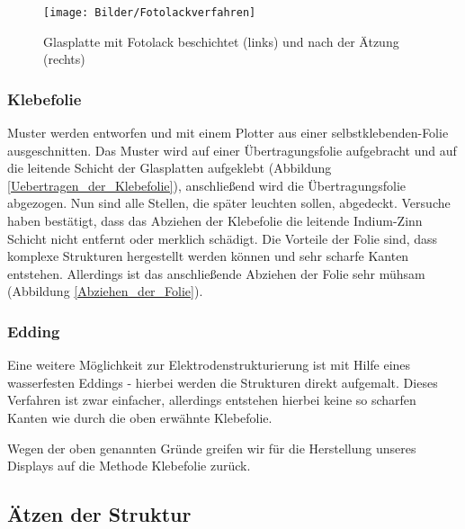 \begin{figure}[t]
  \centering
  \texttt{[image: Bilder/Fotolackverfahren]}
  \caption{Glasplatte mit Fotolack beschichtet (links) und nach der Ätzung (rechts)}
  \label{Fotolackverfahren}
\end{figure}



\subsubsection*{Klebefolie}\label{subsec:klebefolie}
Muster werden entworfen und mit einem Plotter aus einer selbstklebenden-Folie ausgeschnitten. Das Muster wird auf einer Übertragungsfolie aufgebracht und auf die leitende Schicht der Glasplatten aufgeklebt (Abbildung \ref{Uebertragen_der_Klebefolie}), anschließend wird die Übertragungsfolie abgezogen. Nun sind alle Stellen, die später leuchten sollen, abgedeckt. Versuche haben bestätigt, dass das Abziehen der Klebefolie die leitende Indium-Zinn Schicht nicht entfernt oder merklich schädigt. Die Vorteile der Folie sind, dass komplexe Strukturen hergestellt werden können und sehr scharfe Kanten entstehen. Allerdings ist das anschließende Abziehen der Folie sehr mühsam (Abbildung \ref{Abziehen_der_Folie}).


\subsubsection*{Edding}
Eine weitere Möglichkeit zur Elektrodenstrukturierung ist mit Hilfe eines wasserfesten Eddings - hierbei werden die Strukturen direkt aufgemalt. Dieses Verfahren ist zwar einfacher, allerdings entstehen hierbei keine so scharfen Kanten wie durch die oben erwähnte Klebefolie.

Wegen der oben genannten Gründe greifen wir für die Herstellung unseres Displays auf die Methode Klebefolie zurück.


\subsection{Ätzen der Struktur}

